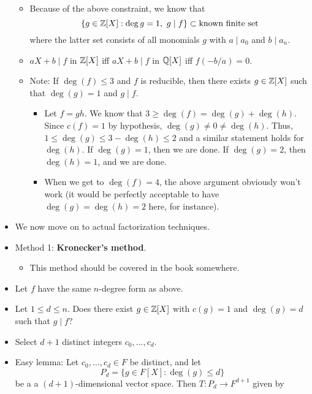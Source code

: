 \documentclass[../notes.tex]{subfiles}
\begin{document}
\begin{itemize}
\begin{itemize}
\begin{itemize}
        \end{itemize}
        \item Because of the above constraint, we know that
        \begin{equation*}
            \{g\in\mathbb{Z}[X]:\deg g=1,\ g\mid f\} \subset \text{known finite set}
        \end{equation*}
        where the latter set consists of all monomials $g$ with $a\mid a_0$ and $b\mid a_n$.
        \item $aX+b\mid f$ in $\mathbb{Z}[X]$ iff $aX+b\mid f$ in $\mathbb{Q}[X]$ iff $f(-b/a)=0$.
        \item Note: If $\deg(f)\leq 3$ and $f$ is reducible, then there exists $g\in\mathbb{Z}[X]$ such that $\deg(g)=1$ and $g\mid f$.
        \begin{itemize}
            \item Let $f=gh$. We know that $3\geq\deg(f)=\deg(g)+\deg(h)$. Since $c(f)=1$ by hypothesis, $\deg(g)\neq 0\neq\deg(h)$. Thus, $1\leq\deg(g)\leq 3-\deg(h)\leq 2$ and a similar statement holds for $\deg(h)$. If $\deg(g)=1$, then we are done. If $\deg(g)=2$, then $\deg(h)=1$, and we are done.
            \item When we get to $\deg(f)=4$, the above argument obviously won't work (it would be perfectly acceptable to have $\deg(g)=\deg(h)=2$ here, for instance).
        \end{itemize}
    \end{itemize}
    \item We now move on to actual factorization techniques.
    \item Method 1: \textbf{Kronecker's method}.
    \begin{itemize}
        \item This method should be covered in the book somewhere.
    \end{itemize}
    \item Let $f$ have the same $n$-degree form as above.
    \item Let $1\leq d\leq n$. Does there exist $g\in\mathbb{Z}[X]$ with $c(g)=1$ and $\deg(g)=d$ such that $g\mid f$?
    \item Select $d+1$ distinct integers $c_0,\dots,c_d$.
    \item Easy lemma: Let $c_0,\dots,c_d\in F$ be distinct, and let
    \begin{equation*}
        P_d = \{g\in F[X]:\deg(g)\leq d\}
    \end{equation*}
    be a a $(d+1)$-dimensional vector space. Then $T:P_d\to F^{d+1}$ given by

\end{itemize}
\end{document}
